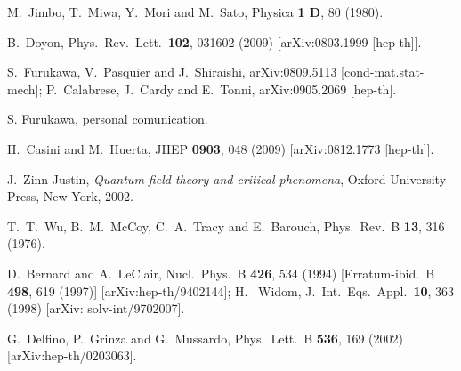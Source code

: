 \documentclass[a4paper]{article}
\begin{document}
\begin{thebibliography}{99}


  M.~Jimbo, T.~Miwa, Y.~Mori and M.~Sato,
Physica  {\bf 1 D}, 80 (1980).

  B.~Doyon,
  Phys.\ Rev.\ Lett.\  {\bf 102}, 031602 (2009)
  [arXiv:0803.1999 [hep-th]].

  S.~Furukawa, V.~Pasquier and J.~Shiraishi,
  arXiv:0809.5113 [cond-mat.stat-mech]; 
  P.~Calabrese, J.~Cardy and E.~Tonni,
  arXiv:0905.2069 [hep-th].

S. Furukawa, personal comunication. 

  H.~Casini and M.~Huerta,
  JHEP {\bf 0903}, 048 (2009)
  [arXiv:0812.1773 [hep-th]].


 J.~Zinn-Justin, {\sl Quantum field theory and critical phenomena}, Oxford University Press, 
 New York, 2002.


T.~T.~Wu, B.~M.~McCoy, C.~A.~Tracy and E.~Barouch,
 Phys.\ Rev.\ B {\bf 13}, 316 (1976).

 D.~Bernard and A.~LeClair,
 Nucl.\ Phys.\ B {\bf 426}, 534 (1994)
 [Erratum-ibid.\ B {\bf 498}, 619 (1997)]
 [arXiv:hep-th/9402144];
 H.~ Widom, J.\ Int.\ Eqs.\ Appl.\ {\bf 10}, 363 (1998) 
 [arXiv: solv-int/9702007].

  G.~Delfino, P.~Grinza and G.~Mussardo,
  Phys.\ Lett.\ B {\bf 536}, 169 (2002)
  [arXiv:hep-th/0203063].


\end{thebibliography}
\end{document}
